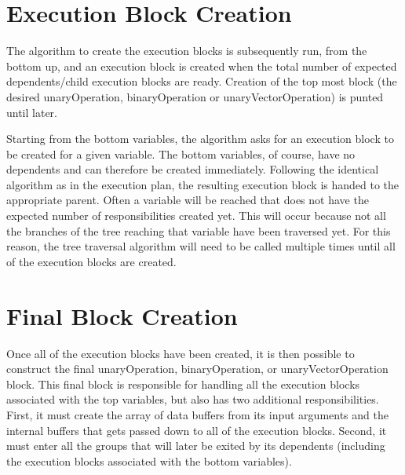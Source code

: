 \documentclass[11pt]{article}
\begin{document}
\section{Execution Block Creation}

The algorithm to create the execution blocks is subsequently run, from the bottom up, and an execution block is created when the total number of expected dependents/child execution blocks are ready. Creation of the top most block (the desired unaryOperation, binaryOperation or unaryVectorOperation) is punted until later.

Starting from the bottom variables, the algorithm asks for an execution block to be created for a given variable. The bottom variables, of course, have no dependents and can therefore be created immediately. Following the identical algorithm as in the execution plan, the resulting execution block is handed to the appropriate parent. Often a variable will be reached that does not have the expected number of responsibilities created yet. This will occur because not all the branches of the tree reaching that variable have been traversed yet. For this reason, the tree traversal algorithm will need to be called multiple times until all of the execution blocks are created.

\section{Final Block Creation}

Once all of the execution blocks have been created, it is then possible to construct the final unaryOperation, binaryOperation, or unaryVectorOperation block. This final block is responsible for handling all the execution blocks associated with the top variables, but also has two additional responsibilities. First, it must create the array of data buffers from its input arguments and the internal buffers that gets passed down to all of the execution blocks. Second, it must enter all the groups that will later be exited by its dependents (including the execution blocks associated with the bottom variables).
\end{document}
